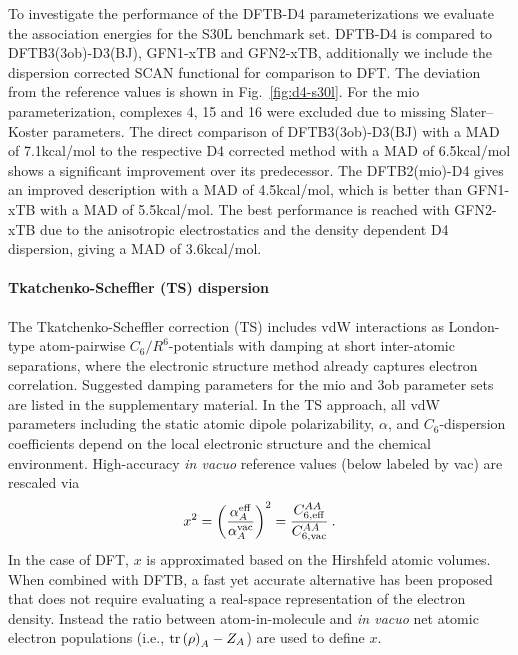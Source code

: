 \documentclass{revtex4-1}
\begin{document}
To investigate the performance of the DFTB-D4 parameterizations we evaluate the
association energies for the S30L benchmark set.\cite{sure2015,brandenburg2018}
DFTB-D4 is compared to DFTB3(3ob)-D3(BJ),\cite{brandenburg2014}
GFN1-xTB\cite{grimme2017} and GFN2-xTB,\cite{bannwarth2019} additionally we
include the dispersion corrected SCAN\cite{sun2015} functional for comparison to
DFT.  The deviation from the reference values is shown in
Fig.~\ref{fig:d4-s30l}. For the mio parameterization, complexes 4, 15 and 16 were
excluded due to missing Slater--Koster parameters.  The direct comparison of
DFTB3(3ob)-D3(BJ) with a MAD of 7.1\;kcal/mol to the respective D4 corrected
method with a MAD of 6.5\;kcal/mol shows a significant improvement over its
predecessor. The DFTB2(mio)-D4 gives an improved description with a MAD of
4.5\;kcal/mol, which is better than GFN1-xTB with a MAD of 5.5\;kcal/mol. The
best performance is reached with GFN2-xTB due to the anisotropic electrostatics
and the density dependent D4 dispersion, giving a MAD of 3.6\;kcal/mol.


\paragraph{Tkatchenko-Scheffler (TS) dispersion}

The Tkatchenko-Scheffler correction (TS)\cite{Tkatchenko2009} includes vdW 
interactions as London-type atom-pairwise $C_6/R^6$-potentials with damping at 
short inter-atomic separations, where the electronic structure method
already captures electron correlation. Suggested damping parameters for the mio and 3ob parameter sets are listed in the supplementary material.
In the TS approach, all vdW parameters including the static atomic dipole 
polarizability, $\alpha$, and $C_6$-dispersion coefficients depend on the local 
electronic structure and the chemical environment.\cite{Tkatchenko2009} 
High-accuracy \textit{in vacuo} reference values (below labeled by vac) are 
rescaled via
\begin{equation}
  x^2 = \left(\frac{\alpha_A^{\rm eff}}{\alpha_A^{\rm vac}}\right)^2 =
  \frac{C_{6,{\rm eff}}^{AA}}{C_{6,{\rm vac}}^{AA}}\:.
  \label{eq:MBDTS_effective_alphaC6}
\end{equation}
In the case of DFT, $x$ is approximated based on the Hirshfeld atomic
volumes.\cite{Hirshfeld1977} When combined with DFTB, a fast yet accurate
alternative has been proposed\cite{Stoehr2016} that does not require
evaluating a real-space representation of the electron density. Instead the
ratio between atom-in-molecule and \textit{in vacuo} net atomic electron
populations (i.e., $\operatorname{tr}\left(\rho\right)_A - Z_A$) are used to define $x$.
\end{document}
